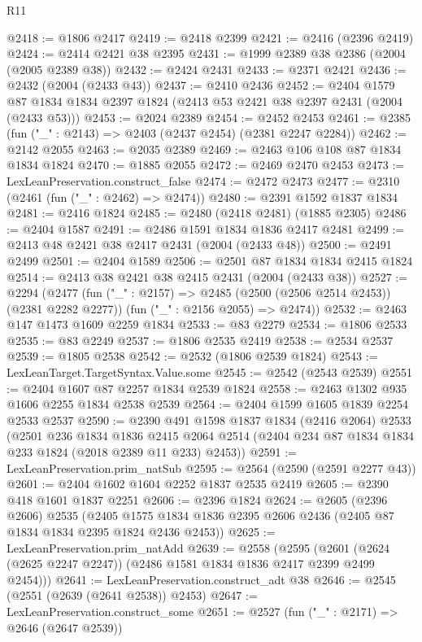 \begin{lexlean}{R11}
\begin{coremodule}
@2418 := @1806 @2417
@2419 := @2418 @2399
@2421 := @2416 (@2396 @2419)
@2424 := @2414 @2421 @38 @2395
@2431 := @1999 @2389 @38 @2386 (@2004 (@2005 @2389 @38))
@2432 := @2424 @2431
@2433 := @2371 @2421
@2436 := @2432 (@2004 (@2433 @43))
@2437 := @2410 @2436
@2452 := @2404
    @1579
    @87
    @1834
    @1834
    @2397
    @1824
    (@2413 @53 @2421 @38 @2397 @2431 (@2004 (@2433 @53)))
@2453 := @2024 @2389
@2454 := @2452 @2453
@2461 := @2385 (fun ("_" : @2143) => @2403 (@2437 @2454) (@2381 @2247 @2284))
@2462 := @2142 @2055
@2463 := @2035 @2389
@2469 := @2463 @106 @108 @87 @1834 @1834 @1824
@2470 := @1885 @2055
@2472 := @2469 @2470 @2453
@2473 := LexLeanPreservation.construct_false
@2474 := @2472 @2473
@2477 := @2310 (@2461 (fun ("_" : @2462) => @2474))
@2480 := @2391 @1592 @1837 @1834
@2481 := @2416 @1824
@2485 := @2480 (@2418 @2481) (@1885 @2305)
@2486 := @2404 @1587
@2491 := @2486 @1591 @1834 @1836 @2417 @2481
@2499 := @2413 @48 @2421 @38 @2417 @2431 (@2004 (@2433 @48))
@2500 := @2491 @2499
@2501 := @2404 @1589
@2506 := @2501 @87 @1834 @1834 @2415 @1824
@2514 := @2413 @38 @2421 @38 @2415 @2431 (@2004 (@2433 @38))
@2527 := @2294
    (@2477
      (fun ("_" : @2157) => @2485 (@2500 (@2506 @2514 @2453)) (@2381 @2282 @2277))
      (fun ("_" : @2156 @2055) => @2474))
@2532 := @2463 @147 @1473 @1609 @2259 @1834
@2533 := @83 @2279
@2534 := @1806 @2533
@2535 := @83 @2249
@2537 := @1806 @2535 @2419
@2538 := @2534 @2537
@2539 := @1805 @2538
@2542 := @2532 (@1806 @2539 @1824)
@2543 := LexLeanTarget.TargetSyntax.Value.some
@2545 := @2542 (@2543 @2539)
@2551 := @2404 @1607 @87 @2257 @1834 @2539 @1824
@2558 := @2463 @1302 @935 @1606 @2255 @1834 @2538 @2539
@2564 := @2404 @1599 @1605 @1839 @2254 @2533 @2537
@2590 := @2390
    @491
    @1598
    @1837
    @1834
    (@2416 @2064)
    @2533
    (@2501
      @236
      @1834
      @1836
      @2415
      @2064
      @2514
      (@2404 @234 @87 @1834 @1834 @233 @1824 (@2018 @2389 @11 @233) @2453))
@2591 := LexLeanPreservation.prim_natSub
@2595 := @2564 (@2590 (@2591 @2277 @43))
@2601 := @2404 @1602 @1604 @2252 @1837 @2535 @2419
@2605 := @2390 @418 @1601 @1837 @2251
@2606 := @2396 @1824
@2624 := @2605
    (@2396 @2606)
    @2535
    (@2405 @1575 @1834 @1836 @2395 @2606 @2436 (@2405 @87 @1834 @1834 @2395 @1824 @2436 @2453))
@2625 := LexLeanPreservation.prim_natAdd
@2639 := @2558
    (@2595 (@2601 (@2624 (@2625 @2247 @2247)) (@2486 @1581 @1834 @1836 @2417 @2399 @2499 @2454)))
@2641 := LexLeanPreservation.construct_adt @38
@2646 := @2545 (@2551 (@2639 (@2641 @2538)) @2453)
@2647 := LexLeanPreservation.construct_some
@2651 := @2527 (fun ("_" : @2171) => @2646 (@2647 @2539))

\end{coremodule}
\end{lexlean}
